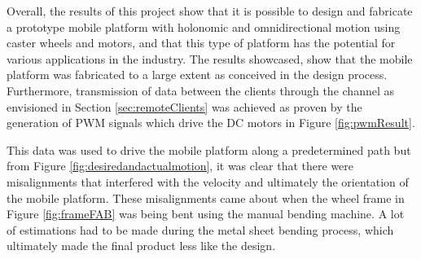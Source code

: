 Overall, the results of this project show that it is possible to design and fabricate a prototype mobile platform with holonomic and omnidirectional motion using caster wheels and motors, and that this type of platform has the potential for various applications in the industry. The results showcased, show that the mobile platform was fabricated to a large extent as conceived in the design process. Furthermore, transmission of data between the clients through the channel as envisioned in Section \ref{sec:remoteClients} was achieved as proven by the generation of PWM signals which drive the DC motors in Figure \ref{fig:pwmResult}.
\par
This data was used to drive the mobile platform along a predetermined path but from Figure \ref{fig:desiredandactualmotion}, it was clear that there were misalignments that interfered with the velocity and ultimately the orientation of the mobile platform. These misalignments came about when the wheel frame in Figure \ref{fig:frameFAB} was being bent using the manual bending machine. A lot of estimations had to be made during the metal sheet bending process, which ultimately made the final product less like the design.


